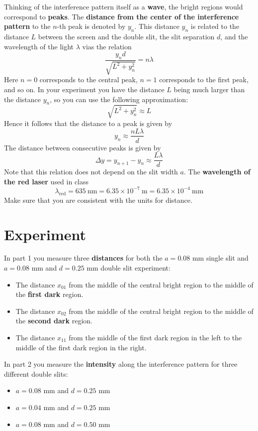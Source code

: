 Thinking of the interference pattern itself as a \textbf{wave}, the bright regions would correspond to \textbf{peaks}. The \textbf{distance from the center of the interference pattern} to the $n$-th peak is denoted by $y_{n}$. This distance $y_{n}$ is related to the distance $L$ between the screen and the double slit, the slit separation $d$, and the wavelength of the light $\lambda$ vias the relation
\begin{equation}
	\frac{y_{n} d}{\sqrt{L^{2} + y_{n}^{2}}} = n \lambda
\end{equation}
Here $n = 0$ corresponds to the central peak, $n = 1$ corresponds to the first peak, and so on. In your experiment you have the distance $L$ being much larger than the distance $y_{n}$, so you can use the following approximation:
\begin{equation}
	\sqrt{L^{2} + y_{n}^{2}} \approx L
\end{equation}
Hence it follows that the distance to a peak is given by
\begin{equation}
	y_{n} \approx \frac{n L \lambda}{d}
\end{equation}
The distance between consecutive peaks is given by
\begin{equation}
	\Delta y = y_{n+1} - y_{n} \approx \frac{L \lambda}{d}
	\label{eq.10.y}
\end{equation}
Note that this relation does not depend on the slit width $a$. The \textbf{wavelength of the red laser} used in class
\begin{equation}
	\lambda_{\text{red}} = 635 \ \text{nm} = 6.35 \times 10^{-7} \ \text{m} = 6.35 \times 10^{-4} \ \text{mm}
\end{equation}
Make sure that you are consistent with the units for distance.
%
\section{Experiment}
%
In part 1 you measure three \textbf{distances} for both the $a = 0.08$ mm single slit and $a = 0.08$ mm and $d = 0.25$ mm double slit experiment:
\begin{itemize}
	\item The distance $x_{01}$ from the middle of the central bright region to the middle of the \textbf{first dark} region.
	\item The distance $x_{02}$ from the middle of the central bright region to the middle of the \textbf{second dark} region.
	\item The distance $x_{11}$ from the middle of the first dark region in the left to the middle of the first dark region in the right.
\end{itemize}
In part 2 you measure the \textbf{intensity} along the interference pattern for three different double slits:
\begin{itemize}
	\item $a = 0.08$ mm and $d = 0.25$ mm
	\item $a = 0.04$ mm and $d = 0.25$ mm
	\item $a = 0.08$ mm and $d = 0.50$ mm
\end{itemize}
%
